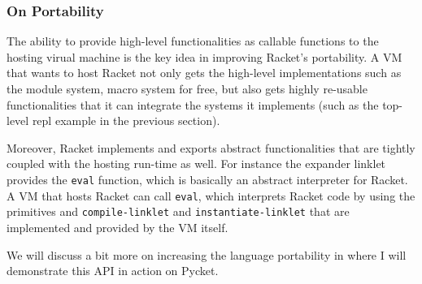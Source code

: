 \subsubsection{On Portability}
\label{subsec:portability}

The ability to provide high-level functionalities as callable
functions to the hosting virual machine is the key idea in improving
Racket's portability. A VM that wants to host Racket not only gets the
high-level implementations such as the module system, macro system for
free, but also gets highly re-usable functionalities that it can
integrate the systems it implements (such as the top-level repl
example in the previous section).

Moreover, Racket implements and exports abstract functionalities that
are tightly coupled with the hosting run-time as well. For instance
the expander linklet provides the \verb|eval| function, which is
basically an abstract interpreter for Racket. A VM that hosts Racket
can call \verb|eval|, which interprets Racket code by using the
primitives and \verb|compile-linklet| and \verb|instantiate-linklet|
that are implemented and provided by the VM itself.

We will discuss a bit more on increasing the language portability in
 where I will demonstrate this API in action on
Pycket.
